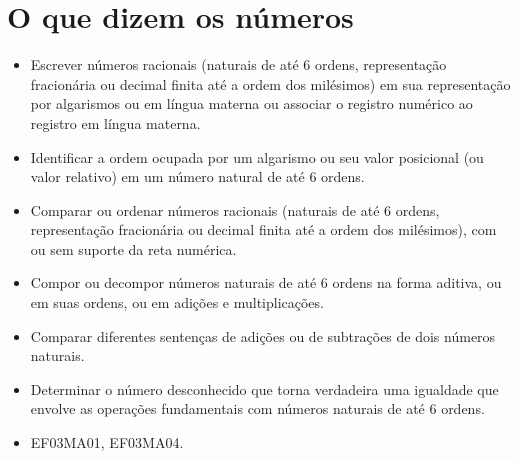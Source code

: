 \pagestyle{mat}
\chapter{O que dizem os números}

\vspace*{-1cm}


\begin{itemize}
  \item Escrever números racionais (naturais de até 6 ordens, representação
fracionária ou decimal finita até a ordem dos milésimos) em sua
representação por algarismos ou em língua materna ou associar o registro
numérico ao registro em língua materna.

  \item Identificar a ordem ocupada por um algarismo ou seu valor posicional
(ou valor relativo) em um número natural de até 6 ordens.

  \item Comparar ou ordenar números racionais (naturais de até 6 ordens,
representação fracionária ou decimal finita até a ordem dos milésimos),
com ou sem suporte da reta numérica.

  \item Compor ou decompor números naturais de até 6 ordens na forma aditiva,
ou em suas ordens, ou em adições e multiplicações.

  \item Comparar diferentes sentenças de adições ou de subtrações de dois
números naturais.

  \item Determinar o número desconhecido que torna verdadeira uma igualdade
que envolve as operações fundamentais com números naturais de até 6
ordens.
\end{itemize}


\begin{itemize}
\item EF03MA01, EF03MA04.
\end{itemize}


